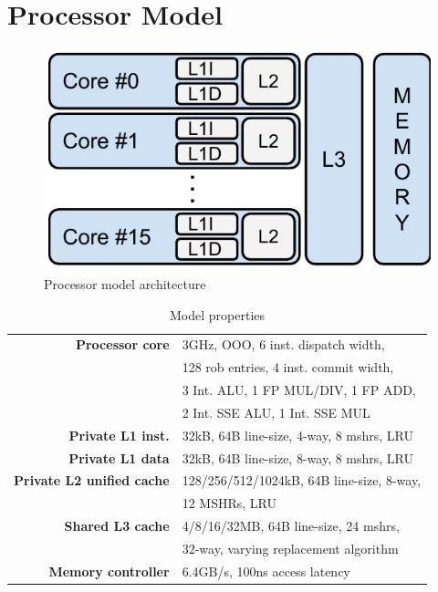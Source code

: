 \section{Processor Model}
\label{sec:methodology:processor_model}

\begin{figure}[ht]
\centering
\includegraphics[scale=.5]{figures/processor_model/processor_model}
\caption{Processor model architecture}
\label{fig:processor_model}
\end{figure}

\begin{table}[ht]
\centering
\begin{tabular}{rl}
\toprule
\bf{Processor core}                 & 3GHz, OOO, 6 inst. dispatch width,     \\
                                    & 128 rob entries, 4 inst. commit width, \\
                                    & 3 Int. ALU, 1 FP MUL/DIV, 1 FP ADD, \\
                                    & 2 Int. SSE ALU, 1 Int. SSE MUL \\
\bf{Private L1 inst.}               & 32kB, 64B line-size, 4-way, 8 mshrs, LRU \\
\bf{Private L1 data}                & 32kB, 64B line-size, 8-way, 8 mshrs, LRU \\
\bf{Private L2 unified cache}       & 128/256/512/1024kB, 64B line-size, 8-way, \\
                                    & 12 MSHRs, LRU      \\
\bf{Shared L3 cache}                & 4/8/16/32MB, 64B line-size, 24 mshrs, \\
                                    & 32-way, varying replacement algorithm         \\
\bf{Memory controller}              & 6.4GB/s, 100ns access latency         \\
\bottomrule                             
\end{tabular}
\caption{Model properties}
\label{tbl:processor_model:properties}
\end{table}

